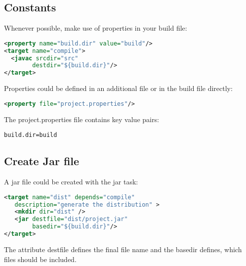 %
\newslide
\subsection{Constants}
Whenever possible, make use of properties in your build file:
\begin{lstlisting}[language=xml, morekeywords={property,target,javac}]
<property name="build.dir" value="build"/>
<target name="compile">
  <javac srcdir="src"
        destdir="${build.dir}"/>
</target>
\end{lstlisting}
Properties could be defined in an additional file or in the build file
directly:
\begin{lstlisting}[language=xml,morekeywords={property}]
<property file="project.properties"/>
\end{lstlisting}
The project.properties file contains key value pairs:
\begin{verbatim}
build.dir=build
\end{verbatim}
%
\newslide
\subsection{Create Jar file}
A jar file could be created with the jar task:
\begin{lstlisting}[language=xml,morekeywords={target,jar,mkdir}]
<target name="dist" depends="compile"
   description="generate the distribution" >
   <mkdir dir="dist" />
   <jar destfile="dist/project.jar"
        basedir="${build.dir}"/>
</target>
\end{lstlisting}
The attribute destfile defines the final file name and the
basedir defines, which files should be included.



